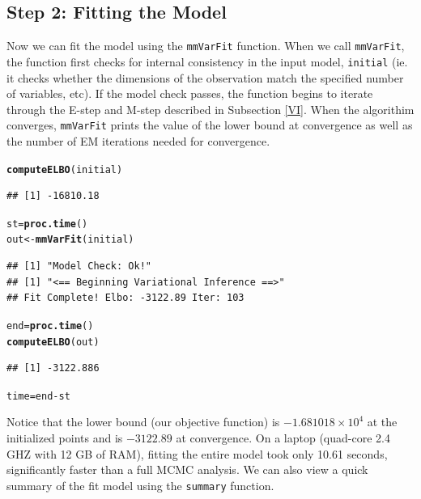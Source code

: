 \documentclass{article}\usepackage[]{graphicx}\usepackage[]{color}
\makeatletter
\newcommand{\hlopt}[1]{\textcolor[rgb]{0,0,0}{#1}}%
\newcommand{\hlstd}[1]{\textcolor[rgb]{0.345,0.345,0.345}{#1}}%
\newcommand{\hlkwb}[1]{\textcolor[rgb]{0.69,0.353,0.396}{#1}}%
\newcommand{\hlkwd}[1]{\textcolor[rgb]{0.737,0.353,0.396}{\textbf{#1}}}%
\newenvironment{kframe}{%
 \def\at@end@of@kframe{}%
 \ifinner\ifhmode%
  \def\at@end@of@kframe{\end{minipage}}%
  \begin{minipage}{\columnwidth}%
 \fi\fi%
 \def\FrameCommand##1{\hskip\@totalleftmargin \hskip-\fboxsep
 \colorbox{shadecolor}{##1}\hskip-\fboxsep
     \hskip-\linewidth \hskip-\@totalleftmargin \hskip\columnwidth}%
 \MakeFramed {\advance\hsize-\width
   \@totalleftmargin\z@ \linewidth\hsize
   \@setminipage}}%
 {\par\unskip\endMakeFramed%
 \at@end@of@kframe}
\newenvironment{knitrout}{}{} %
\renewenvironment{knitrout}{\begin{singlespace}}{\end{singlespace}}
\makeatother
\begin{document}
\subsection*{Step 2: Fitting the Model}
Now we can fit the model using the \texttt{mmVarFit} function. When we call \texttt{mmVarFit}, the function first checks for internal consistency in the input model, \texttt{initial} (ie. it checks whether the dimensions of the observation match the specified number of variables, etc). If the model check passes, the function begins to iterate through the E-step and M-step described in Subsection \ref{VI}. When the algorithim converges, \texttt{mmVarFit} prints the value of the lower bound at convergence as well as the number of EM iterations needed for convergence.

\begin{knitrout}
\color{fgcolor}\begin{kframe}
\begin{alltt}
\hlkwd{computeELBO}\hlstd{(initial)}
\end{alltt}
\begin{verbatim}
## [1] -16810.18
\end{verbatim}
\begin{alltt}
\hlstd{st} \hlkwb{=} \hlkwd{proc.time}\hlstd{()}
\hlstd{out} \hlkwb{<-} \hlkwd{mmVarFit}\hlstd{(initial)}
\end{alltt}
\begin{verbatim}
## [1] "Model Check: Ok!"
## [1] "<== Beginning Variational Inference ==>"
## Fit Complete! Elbo: -3122.89 Iter: 103
\end{verbatim}
\begin{alltt}
\hlstd{end} \hlkwb{=} \hlkwd{proc.time}\hlstd{()}
\hlkwd{computeELBO}\hlstd{(out)}
\end{alltt}
\begin{verbatim}
## [1] -3122.886
\end{verbatim}
\begin{alltt}
\hlstd{time} \hlkwb{=} \hlstd{end} \hlopt{-} \hlstd{st}
\end{alltt}
\end{kframe}
\end{knitrout}

Notice that the lower bound (our objective function) is \ensuremath{-1.681018\times 10^{4}} at the initialized points and is \ensuremath{-3122.89} at convergence. On a laptop (quad-core 2.4 GHZ with 12 GB of RAM), fitting the entire model took only 10.61 seconds, significantly faster than a full MCMC analysis.  
We can also view a quick summary of the fit model using the \texttt{summary} function.
\end{document}
